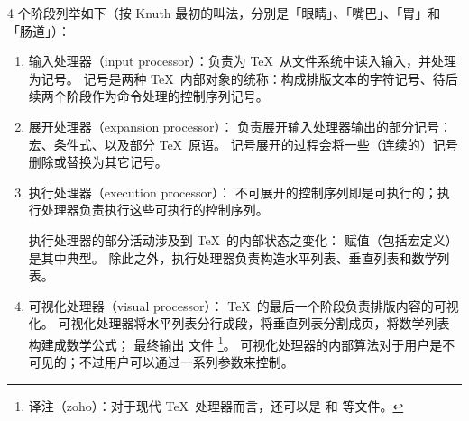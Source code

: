\documentclass{book}
\begin{document}
4 个阶段列举如下（按 Knuth 最初的叫法，分别是「眼睛」、「嘴巴」、「胃」和「肠道」）：
\begin{enumerate}
\item 输入处理器（input processor）：负责为 \TeX\ 从文件系统中读入输入，并处理为记号。
记号是两种 \TeX\ 内部对象的统称：构成排版文本的字符记号、待后续两个阶段作为命令处理的控制序列记号。
\item 展开处理器（expansion processor）：
负责展开输入处理器输出的部分记号：宏、条件式、以及部分 \TeX\ 原语。
记号展开的过程会将一些（连续的）记号删除或替换为其它记号。
\item 执行处理器（execution processor）：
不可展开的控制序列即是可执行的；执行处理器负责执行这些可执行的控制序列。

执行处理器的部分活动涉及到 \TeX\ 的内部状态之变化：
赋值（包括宏定义）是其中典型。
除此之外，执行处理器负责构造水平列表、垂直列表和数学列表。
\item 可视化处理器（visual processor）：
\TeX\ 的最后一个阶段负责排版内容的可视化。
可视化处理器将水平列表分行成段，将垂直列表分割成页，将数学列表构建成数学公式；
最终输出  文件%
\footnote{译注（zoho）：对于现代 \TeX\ 处理器而言，还可以是  和  等文件。}。
可视化处理器的内部算法对于用户是不可见的；不过用户可以通过一系列参数来控制。
\end{enumerate}
\end{document}
